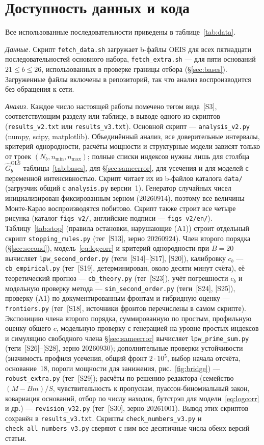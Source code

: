 \documentclass[11pt,a4paper]{article}
\theoremstyle{plain}
\theoremstyle{remark}
\begin{document}
\section*{Доступность данных и кода}
Все использованные последовательности приведены в таблице~\ref{tab:data}.

\emph{Данные.} Скрипт \texttt{fetch\_data.sh} загружает b-файлы OEIS для всех
пятнадцати последовательностей основного набора, \texttt{fetch\_extra.sh} --- для
пяти оснований $21\le b\le26$, использованных в проверке границы отбора
(\S\ref{sec:bases}). Загруженные файлы включены в репозиторий, так что анализ
воспроизводится без обращения к сети.

\emph{Анализ.} Каждое число настоящей работы помечено тегом вида~[S3],
соответствующим разделу или таблице, в выводе одного из скриптов
(\texttt{results\_v2.txt} или \texttt{results\_v3.txt}). Основной скрипт ---
\texttt{analysis\_v2.py} (numpy, scipy, matplotlib). Объединённый анализ, все
доверительные интервалы, критерий однородности, расчёты мощности и структурные
модели зависят только от троек $(N_b,n_{\min},n_{\max})$; полные списки индексов
нужны лишь для столбца $\hat G^{\mathrm{OLS}}_b$ таблицы~\ref{tab:bases}, для
\S\ref{sec:sameerror}, для усечения и для моделей с переменной интенсивностью.
Скрипт читает их из b-файлов каталога \texttt{data/} (загрузчик общий с
\texttt{analysis.py} версии~1). Генератор случайных чисел инициализирован
фиксированным зерном ($20260914$), поэтому все величины Монте-Карло воспроизводятся
побитово. Скрипт также строит все четыре рисунка (каталог \texttt{figs\_v2/},
английские подписи --- \texttt{figs\_v2/en/}). Таблицу~\ref{tab:stop}
(правила остановки, нарушающие (A1)) строит отдельный скрипт
\texttt{stopping\_rules.py} (тег~[S13], зерно $20260924$). Член второго
порядка (\S\ref{sec:second}), модель~\eqref{eq:logcorr} и критерий однородности при
$B=20$ вычисляет \texttt{lpw\_second\_order.py} (теги~[S14]--[S17], [S20]),
калибровку $c_b$ --- \texttt{cb\_empirical.py} (тег~[S19], детерминирован, около
десяти минут счёта), её теоретический прогноз --- \texttt{cb\_theory.py}
(тег~[S23]), учёт погрешности $c_b$ и модельную проверку метода ---
\texttt{sim\_second\_order.py} (теги~[S24], [S25]), проверку (A1) по
документированным фронтам и гибридную оценку --- \texttt{frontiers.py} (тег~[S18],
источники фронтов перечислены в самом скрипте). Экспозицию члена второго порядка,
суммированную по простым, профильную оценку общего $c$, модельную проверку с
генерацией на уровне простых индексов и симуляцию свободного члена
\S\ref{sec:sameerror} вычисляет \texttt{lpw\_prime\_sum.py} (теги~[S26]--[S28],
зерно $20260930$); дополнительные проверки устойчивости (значимость профиля
усечения, общий фронт $2\cdot10^5$, выбор начала отсчёта, основание~18, пороги
мощности для занижения, рис.~\ref{fig:bridge}) --- \texttt{robust\_extra.py}
(тег~[S29]); расчёты по решению редактора (семейство $(M-Bm)/S$, чувствительность к
пропускам, пуассон-биномиальный закон, ковариация оснований, отбор по числу
находок, бутстрэп для модели~\eqref{eq:logcorr} и др.) --- \texttt{revision\_v32.py}
(тег~[S30], зерно $20261001$). Вывод этих скриптов сохранён в
\texttt{results\_v3.txt}. Скрипты
\texttt{check\_numbers\_v3.py} и \texttt{check\_all\_numbers\_v3.py} сверяют с ним
все десятичные числа обеих версий статьи.
\end{document}
